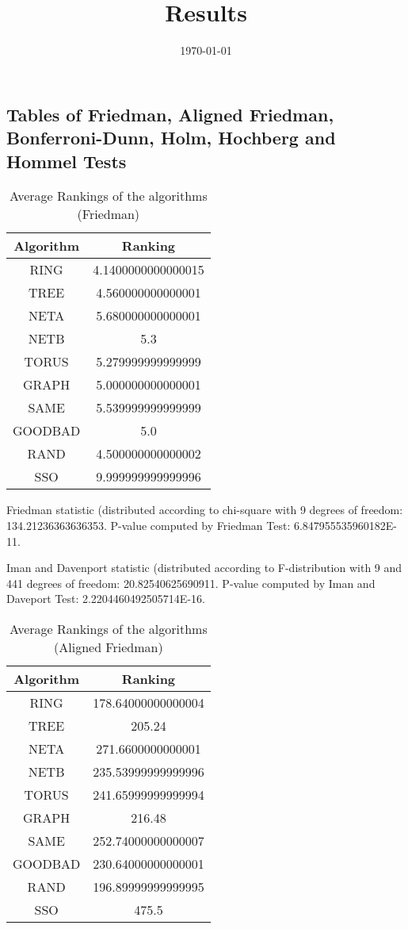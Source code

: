 \documentclass[a4paper,10pt]{article}
\title{Results}
\author{}
\date{\today}
\begin{document}
\begin{landscape}
\oddsidemargin 0in \topmargin 0in\maketitle
\section{Tables of Friedman, Aligned Friedman, Bonferroni-Dunn, Holm, Hochberg and Hommel Tests}
\begin{table}[!htp]
\centering
\caption{Average Rankings of the algorithms (Friedman)
}\begin{tabular}{c|c}
Algorithm&Ranking\\
\hline
 RING&4.1400000000000015\\
 TREE&4.560000000000001\\
 NETA&5.680000000000001\\
 NETB&5.3\\
 TORUS&5.279999999999999\\
 GRAPH&5.000000000000001\\
 SAME&5.539999999999999\\
 GOODBAD&5.0\\
 RAND&4.500000000000002\\
 SSO&9.999999999999996\\
\end{tabular}
\end{table}


Friedman statistic (distributed according to chi-square with 9 degrees of freedom: 134.21236363636353. 
P-value computed by Friedman Test: 6.847955535960182E-11.\newline

Iman and Davenport statistic (distributed according to F-distribution with 9 and 441 degrees of freedom: 20.82540625690911. 
P-value computed by Iman and Daveport Test: 2.2204460492505714E-16.\newline


\newpage

\begin{table}[!htp]
\centering
\caption{Average Rankings of the algorithms (Aligned Friedman)
}\begin{tabular}{c|c}
Algorithm&Ranking\\
\hline
 RING&178.64000000000004\\
 TREE&205.24\\
 NETA&271.6600000000001\\
 NETB&235.53999999999996\\
 TORUS&241.65999999999994\\
 GRAPH&216.48\\
 SAME&252.74000000000007\\
 GOODBAD&230.64000000000001\\
 RAND&196.89999999999995\\
 SSO&475.5\\
\end{tabular}
\end{table}



\end{landscape}
\end{document}
